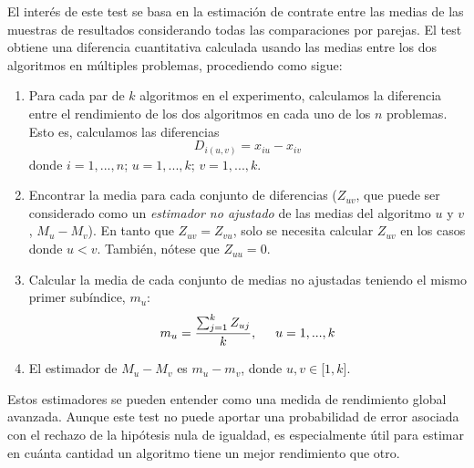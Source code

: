 El interés de este test se basa en la estimación de contrate entre las medias de las muestras de resultados considerando todas las comparaciones por parejas. 
El test obtiene una diferencia cuantitativa calculada usando las medias entre los dos algoritmos en múltiples problemas, procediendo como sigue:
\begin{enumerate}
	\item Para cada par de $k$ algoritmos en el experimento, calculamos la diferencia entre el rendimiento de los dos algoritmos en cada uno de los $n$ problemas. 
	Esto es, calculamos las diferencias
	\begin{equation}
	D_{i(u,v)} = x_{iu} - x_{iv}
	\label{eq:4.48}
	\end{equation}
	donde $i=1,...,n$; $u=1,...,k$; $v = 1,...,k$.
	\item Encontrar la media para cada conjunto de diferencias ($Z_{uv}$, que puede ser considerado como un \textit{estimador no ajustado} de las medias del algoritmo $u$ y $v$, $M_u - M_v$). 
	En tanto que $Z_{uv} = Z_{vu}$, solo se necesita calcular $Z_{uv}$ en los casos donde $u < v$. 
	También, nótese que $Z_{uu} = 0$.
	\item Calcular la media de cada conjunto de medias no ajustadas teniendo el mismo primer subíndice, $m_u$:
	\begin{equation}
	m_u = \dfrac{\sum_{j=1}^{k}Z_{uj}}{k}, \hspace{0.5cm} u = 1,...,k
	\label{eq:4.49}
	\end{equation}
	\item El estimador de $M_u-M_v$ es $m_u - m_v$, donde $u,v \in$[$1,k$].
\end{enumerate}

Estos estimadores se pueden entender como una medida de rendimiento global avanzada. 
Aunque este test no puede aportar una probabilidad de error asociada con el rechazo de la hipótesis nula de igualdad, es especialmente útil para estimar en cuánta cantidad un algoritmo tiene un mejor rendimiento que otro. 
